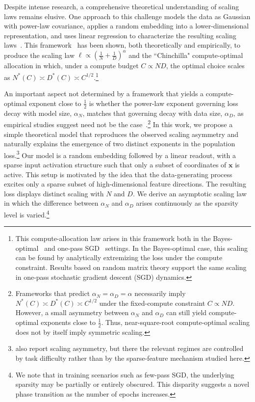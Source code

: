 \documentclass[11pt]{article}
\theoremstyle{plain}
\theoremstyle{definition}
\theoremstyle{remark}
\newcommand{\JSCheck}[1]{#1}
\begin{document}
Despite intense research, a comprehensive theoretical understanding of scaling laws remains elusive. \JSCheck{One approach to this challenge models the data as Gaussian with power-law covariance, applies a random embedding into a lower-dimensional representation, and uses linear regression to characterize the resulting scaling laws~\citep{pmlr-v119-bordelon20a,Spigler_2020,Bahri2021ExplainingScaling,Maloney2022SolvableScaling}.} This framework~\citep{Maloney2022SolvableScaling} has been shown, both theoretically and empirically, to produce the scaling law $\ell \propto \left(\frac{1}{N} + \frac{1}{D}\right)^{\alpha}$ and the ``Chinchilla" compute-optimal allocation in which, under a compute budget $C \propto N D$, the optimal choice scales as $N^*(C)\asymp D^*(C)\asymp C^{1/2}$.\footnote{This compute-allocation law arises in this framework both in the Bayes-optimal~\citep{Bahri2021ExplainingScaling, Maloney2022SolvableScaling} and one-pass SGD~\citep{Bordelon2024DynamicalScaling,Paquette2024Phases} settings. In the Bayes-optimal case, this scaling can be found  by analytically extremizing the loss under the compute constraint. Results based on random matrix theory support the same scaling in one-pass stochastic gradient descent (SGD) dynamics.}

\JSCheck{An important aspect not determined by a framework that yields a compute-optimal exponent close to $\tfrac{1}{2}$ is whether the power-law exponent governing loss decay with model size, $\alpha_N$, matches that governing decay with data size, $\alpha_D$, as empirical studies suggest need not be the case~\citep{Hoffmann2022Chinchilla}.}\footnote{\JSCheck{Frameworks that predict $\alpha_N = \alpha_D = \alpha$ necessarily imply $N^*(C)\asymp D^*(C)\asymp C^{1/2}$ under the fixed-compute constraint $C \propto ND$. However, a small asymmetry between $\alpha_N$ and $\alpha_D$ can still yield compute-optimal exponents close to $\tfrac{1}{2}$. Thus, near-square-root compute-optimal scaling does not by itself imply symmetric scaling.}} \JSCheck{In this work, we propose a simple theoretical model that reproduces the observed scaling asymmetry and naturally explains the emergence of two distinct exponents in the  population loss.}\footnote{\JSCheck{\citet{bordelon2025featurelearning} also report scaling asymmetry, but there the relevant regimes are controlled by task difficulty rather than by the sparse-feature mechanism studied here.}}  \JSCheck{
Our model is a random embedding followed by a linear readout, with a sparse input activation structure such that only a subset of coordinates of \(\mathbf{x}\) is active. This setup is motivated by the idea that the data-generating process excites only a sparse subset of high-dimensional feature directions. The resulting loss displays distinct scaling with $N$ and $D$. We derive an asymptotic scaling law in which the difference between $\alpha_N$ and $\alpha_D$ arises continuously as the sparsity level is varied.}\footnote{We note that in training scenarios such as few-pass SGD, the underlying sparsity may be partially or entirely obscured. This disparity suggests a novel phase transition as the number of epochs increases.}
\end{document}
